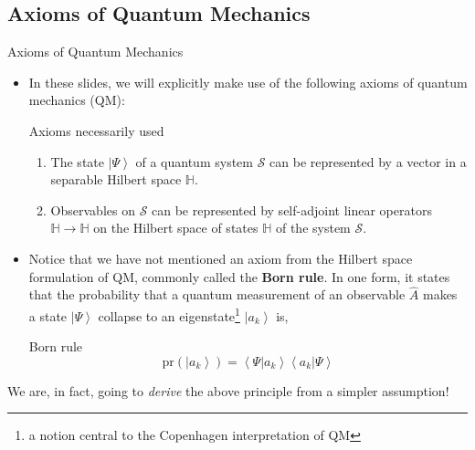 \documentclass[9pt,handout]{beamer}
\newcommand{\pr}[0]{\text{pr}}
\begin{document}
\subsection{Axioms of Quantum Mechanics}
\begin{frame}{Axioms of Quantum Mechanics}
\begin{itemize}
\item In these slides, we will explicitly make use of the following axioms of quantum mechanics (QM):

\begin{block}{Axioms necessarily used}
\begin{enumerate}
\item The state $\left\lvert \Psi \right\rangle$ of a quantum system $\mathcal{S}$ can be represented by a vector in a separable Hilbert space $\mathbb{H}$.
\item Observables on $\mathcal{S}$ can be represented by self-adjoint linear operators $\mathbb{H} \to \mathbb{H}$ on the Hilbert space of states $\mathbb{H}$ of the system $\mathcal{S}$.
\end{enumerate}
\end{block}

\item Notice that we have not mentioned an axiom from the Hilbert space formulation of QM, commonly called the \textbf{Born rule}. In one form, it states that the probability that a quantum measurement of an observable $\widehat{A}$ makes a state $\left\lvert \Psi \right\rangle$ collapse to an eigenstate\footnote{a notion central to the Copenhagen interpretation of QM} $\left\lvert a_k \right\rangle$ is,

\begin{block}{Born rule}
$$\pr \left( \left\lvert a_k \right\rangle \right) = \left\langle \Psi \right. \left\lvert a_k \right\rangle \left\langle a_k \right. \left\lvert \Psi \right\rangle$$
\end{block}
\end{itemize}

We are, in fact, going to \emph{derive} the above principle from a simpler assumption!
\end{frame}
\end{document}
